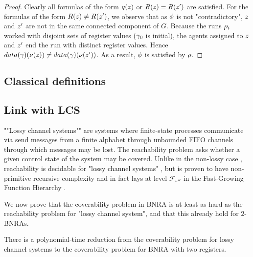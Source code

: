 \begin{proof}
	
	Clearly all formulas of the form $q(\varz)$ or $R(\varz) = R(\varz')$ are satisfied.
	For the formulas of the form $R(\varz) \neq R(\varz')$, we observe that as $\phi$ is not "contradictory", $\varz$ and $\varz'$ are not in the same connected component of $G$. Because the runs $\rho_i$ worked with disjoint sets of register values ($\gamma_0$ is initial), the agents assigned to $\varz$ and $\varz'$ end the run with distinct register values.
	Hence $\data{\config}(\nu(\varz)) \neq \data{\config}(\nu(\varz'))$. As a result, $\phi$ is satisfied by $\rho$.
\end{proof}
\fi
\fi


\subsection{Classical definitions}

\subsection{Link with LCS}


""Lossy channel systems""  are systems where finite-state processes communicate via send messages from a finite alphabet through unbounded FIFO channels through which messages may be lost. The reachability problem asks whether a given control state of the system may be covered. Unlike in the non-lossy case \cite{BZ83}, reachability is decidable for "lossy channel systems" \cite{AK95,AbdullaJ1996undec}, but is proven to have non-primitive recursive complexity \cite{Schnoebelen2002verifying} and in fact lays at level $\mathcal{F}_{\omega^{\omega}}$ in the Fast-Growing Function Hierarchy \cite{ChambartS2008ordinal}.

We now prove that the coverability problem in BNRA is at least as hard as the reachability problem for "lossy channel system", and that this already hold for $2$-BNRAs.  
\begin{proposition}
	\label{prop:reduction-LCS}
	There is a polynomial-time reduction from the coverability problem for lossy channel systems to the coverability problem for BNRA with two registers.
\end{proposition}

